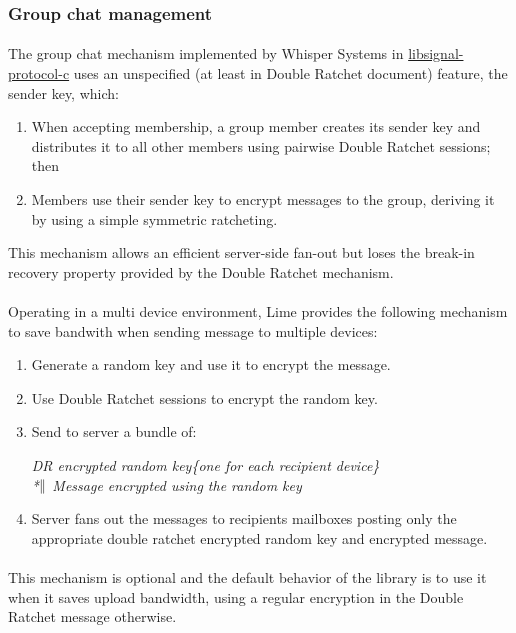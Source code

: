 \documentclass[a4paper,11pt]{article}
\begin{document}
  \subsubsection{Group chat management}
    \label{subsubsec:groupchat}
    \paragraph*{}The group chat mechanism implemented by Whisper Systems in \href{https://github.com/WhisperSystems/libsignal-protocol-c}{libsignal-protocol-c}\cite{libsignal} uses an unspecified (at least in Double Ratchet document\cite{doubleRatchet}) feature, the sender key, which:
    \begin{enumerate}
      \item When accepting membership, a group member creates its sender key and distributes it to all other members using pairwise Double Ratchet sessions; then
      \item Members use their sender key to encrypt messages to the group, deriving it by using a simple symmetric ratcheting.
    \end{enumerate}
    This mechanism allows an efficient server-side fan-out but loses the break-in recovery property provided by the Double Ratchet mechanism.

    \paragraph*{}Operating in a multi device environment, Lime provides the following mechanism to save bandwith when sending message to multiple devices:
    \begin{enumerate}
      \item Generate a random key and use it to encrypt the message.
      \item Use Double Ratchet sessions to encrypt the random key.
      \item Send to server a bundle of:
        \begin{center}
          \textit{DR encrypted random key\{one for each recipient device\}\\*$\Arrowvert$ Message encrypted using the random key}
        \end{center}
      \item Server fans out the messages to recipients mailboxes posting only the appropriate double ratchet encrypted random key and encrypted message.
    \end{enumerate}
    \paragraph{}This mechanism is optional and the default behavior of the library is to use it when it saves upload bandwidth, using a regular encryption in the Double Ratchet message otherwise.
\end{document}
